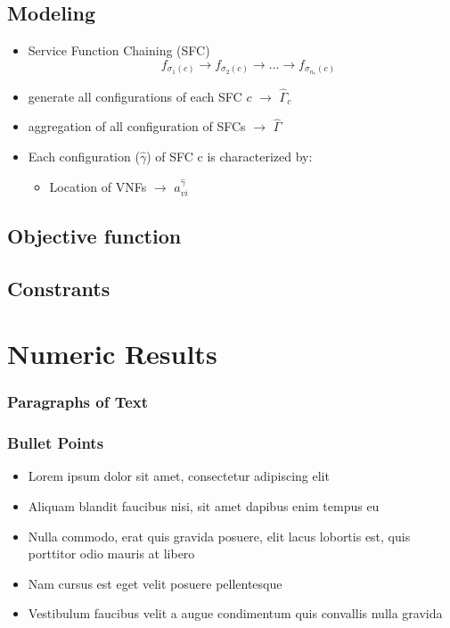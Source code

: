 \documentclass{beamer}
\begin{document}
\subsection{Modeling}
\begin{frame}
	\begin{itemize}
		\item <1-> {Service Function Chaining (SFC)
	\begin{equation}
	[SFC\: c]\quad f_{\sigma_{1}(c)} \to f_{\sigma_{2}(c)} \to \dots \to f_{\sigma_{n_c}(c)}
	\end{equation}}
		\item <2-> {generate all configurations of each SFC $c$  $\to$ $\hat{\Gamma}_c$}
		\item <3-> {aggregation of all configuration of SFCs $\to$ $\hat{\Gamma}$}
		\item <4-> {Each configuration ($\hat{\gamma}$) of SFC c is characterized by:}
		\begin{itemize}
			\item <4-> {Location of VNFs $\to$ $a^{\hat{\gamma}}_{vi}$}
		\end{itemize}
	\end{itemize}
		
\end{frame}
\subsection{Objective function}

\subsection{Constrants}

\section{Numeric Results}
\begin{frame}
\frametitle{Paragraphs of Text}

\end{frame}


\begin{frame}
\frametitle{Bullet Points}
\begin{itemize}
\item Lorem ipsum dolor sit amet, consectetur adipiscing elit
\item Aliquam blandit faucibus nisi, sit amet dapibus enim tempus eu
\item Nulla commodo, erat quis gravida posuere, elit lacus lobortis est, quis porttitor odio mauris at libero
\item Nam cursus est eget velit posuere pellentesque
\item Vestibulum faucibus velit a augue condimentum quis convallis nulla gravida
\end{itemize}
\end{frame}
\end{document}

